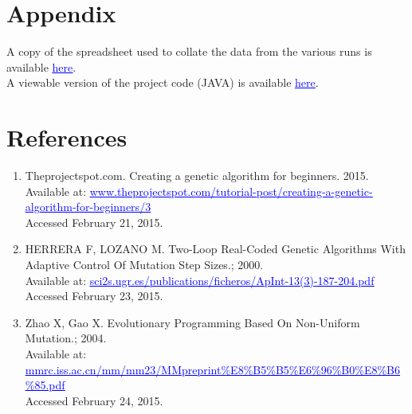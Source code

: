 \documentclass{article}
\begin{document}
\section{Appendix}
A copy of the spreadsheet used to collate the data from the various runs is available \href{https://github.com/Mattie432/Nature-Inspired-Optimization/blob/master/Report/Assignment1/Spreadsheet.xlsx}{\textcolor{blue}{\uline{here}}}.\\
A viewable version of the project code (JAVA) is available \href{https://github.com/Mattie432/Nature-Inspired-Optimizationx}{\textcolor{blue}{\uline{here}}}.

\section{References}
\begin{enumerate}
\item Theprojectspot.com. Creating a genetic algorithm for beginners. 2015.\\ Available at: \href{http://www.theprojectspot.com/tutorial-post/creating-a-genetic-algorithm-for-beginners/3}{\textcolor{blue}{\uline{www.theprojectspot.com/tutorial-post/creating-a-genetic-algorithm-for-beginners/3}}}\\ Accessed February 21, 2015.

\item HERRERA F, LOZANO M. Two-Loop Real-Coded Genetic Algorithms With Adaptive Control Of Mutation Step Sizes.; 2000. \\Available at: \href{http://sci2s.ugr.es/publications/ficheros/ApInt-13(3)-187-204.pdf}{\textcolor{blue}{\uline{sci2s.ugr.es/publications/ficheros/ApInt-13(3)-187-204.pdf}}}\\ Accessed February 23, 2015.

\item Zhao X, Gao X. Evolutionary Programming Based On Non-Uniform Mutation.; 2004. \\Available at: \href{http://mmrc.iss.ac.cn/mm/mm23/MMpreprint\%E8\%B5\%B5\%E6\%96\%B0\%E8\%B6\%85.pdf}{\textcolor{blue}{\uline{mmrc.iss.ac.cn/mm/mm23/MMpreprint\%E8\%B5\%B5\%E6\%96\%B0\%E8\%B6\%85.pdf}}}\\Accessed February 24, 2015.

\end{enumerate}
\end{document}
